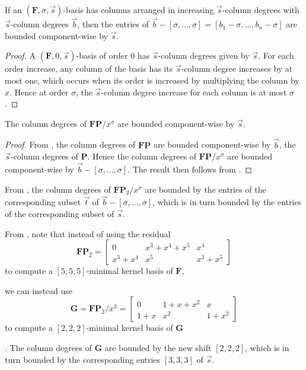 \begin{lem}
\label{lem:boundOnShiftedDegrees}%
If an $(\mathbf{F},\sigma,\vec{s})$-basis has columns arranged in
increasing $\vec{s}$-column degrees with $\vec{s}$-column degrees
$\vec{b}$, then the entries of $\vec{b}-[\sigma,\dots,\sigma]=\left[b_{1}-\sigma,\dots,b_{n}-\sigma\right]$
are bounded component-wise by $\vec{s}$. \end{lem}
\begin{proof}
A $(\mathbf{F},0,\vec{s})$-basis of order $0$ has $\vec{s}$-column
degrees given by $\vec{s}$. For each order increase, any column of
the basis has its $\vec{s}$-column degree increases by at most one,
which occurs when its order is increased by multiplying the column
by $x$. Hence at order $\sigma$, the $\vec{s}$-column degree increase
for each column is at most $\sigma$. \end{proof}
\begin{cor}
\label{cor:boundOnFPAfterLowerTermsRemoved}The column degrees of
$\mathbf{F}\mathbf{P}/x^{\sigma}$ are bounded component-wise by $\vec{s}$.\end{cor}
\begin{proof}
From , the column degrees of $\mathbf{F}\mathbf{P}$
are bounded component-wise by $\vec{b}$, the $\vec{s}$-column degrees
of $\mathbf{P}$. Hence the column degrees of $\mathbf{F}\mathbf{P}/x^{\sigma}$
are bounded component-wise by $\vec{b}-[\sigma,\dots,\sigma]$. The
result then follows from . 
\end{proof}
From , the column
degrees of $\mathbf{F}\mathbf{P}_{2}/x^{\sigma}$ are bounded by the
entries of the corresponding subset $\vec{t}$ of $\vec{b}-[\sigma,\dots,\sigma]$,
which is in turn bounded by the entries of the corresponding subset
of $\vec{s}$. 
\begin{example}
\label{exm:reducingDegree}From ,
note that instead of using the residual 
\[
\mathbf{F}\mathbf{P}_{2}=\left[\begin{array}{ccc}
0 & x^{3}+x^{4}+x^{5} & x^{4}\\
x^{3}+x^{4} & x^{5} & x^{3}+x^{5}
\end{array}\right]
\]
 to compute a $[5,5,5]$-minimal kernel basis of $\mathbf{F}$,%
\begin{comment}
$\left(\mathbf{F}\mathbf{P}_{2},\tau,[5,5,5]\right)$-basis,
\end{comment}
{} we can instead use 
\[
\mathbf{G}=\mathbf{F}\mathbf{P}_{2}/x^{3}=\left[\begin{array}{ccc}
0 & 1+x+x^{2} & x\\
1+x & x^{2} & 1+x^{2}
\end{array}\right]
\]
 to compute a $[2,2,2]$-minimal kernel basis of $\mathbf{G}$%
\begin{comment}
$\left(\mathbf{G},\tau,[2,2,2]\right)$-basis
\end{comment}
. The column degrees of $\mathbf{G}$ are bounded by the new shift
$\left[2,2,2\right]$, which is in turn bounded by the corresponding
entries $\left[3,3,3\right]$ of $\vec{s}$. 
\end{example}
